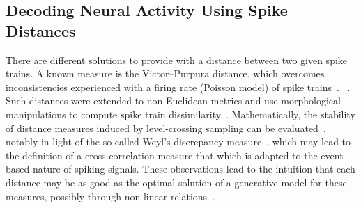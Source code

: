 \documentclass[brainsci, %
               review,accept,pdftex,moreauthors
               ]{Definitions/mdpi}
\begin{document}
\subsection{Decoding Neural Activity Using Spike Distances}
There are different solutions to provide with a distance between two given spike trains. A known measure is the Victor--Purpura distance, which overcomes inconsistencies experienced with a  firing rate (Poisson model) of spike trains~\citep{victor_nature_1996}. ~\citep{van_rossum_novel_2001}.  Such distances were extended to non-Euclidean metrics and use morphological manipulations to compute spike train dissimilarity~\citep{kreuz_measuring_2007}. Mathematically, the stability of distance measures induced by level-crossing sampling can be evaluated~\citep{moser_stability_2014}, notably in light of the so-called Weyl's discrepancy measure~\citep{weyl_ueber_1916}, which may lead to the definition of a cross-correlation measure that which is adapted to the event-based nature of spiking signals. These observations lead to the intuition that each distance may be as good as the optimal solution of a generative model for these measures, possibly through non-linear relations~\citep{aronov_non-euclidean_2004}. %
\end{document}
